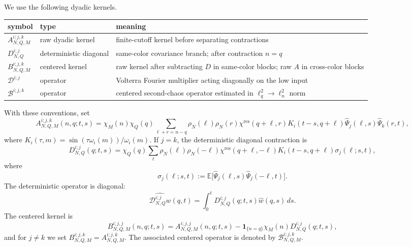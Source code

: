 \documentclass[10pt]{amsart}
\numberwithin{equation}{section}
\theoremstyle{plain}
\theoremstyle{definition}
\theoremstyle{remark}
\newcommand{\E}{\mathbb{E}}
\newcommand{\one}{\mathbf{1}}
\begin{document}
We use the following dyadic kernels.
\begin{center}
\small
\begin{tabular}{@{}p{}p{}p{}@{}}
\toprule
symbol & type & meaning \\
\midrule
$A_{N,Q,M}^{i;j,k}$ & raw dyadic kernel & finite-cutoff kernel before separating contractions \\
$D_{N,Q}^{i;j}$ & deterministic diagonal & same-color covariance branch; after contraction $n=q$ \\
$B_{N,Q,M}^{i;j,k}$ & centered kernel & raw kernel after subtracting $D$ in same-color blocks; raw $A$ in cross-color blocks \\
$\mathcal D^{i;j}$ & operator & Volterra Fourier multiplier acting diagonally on the low input \\
$\mathcal B^{i;j,k}$ & operator & centered second-chaos operator estimated in $\ell^2_q\to\ell^2_n$ norm \\
\bottomrule
\end{tabular}
\end{center}
With these conventions, set
\begin{equation}\label{eq:A-kernel}
A_{N,Q,M}^{i;j,k}(n,q;t,s)=\chi_M(n)\chi_Q(q)
\sum_{\ell+r=n-q}\rho_N(\ell)\rho_N(r)\chi^{\mathrm{res}}(q+\ell,r)
K_i(t-s,q+\ell)\widehat\Psi_j(\ell,s)\widehat\Psi_k(r,t),
\end{equation}
where $K_i(\tau,m)=\sin(\tau\omega_i(m))/\omega_i(m)$.  If $j=k$, the deterministic diagonal contraction is
\begin{equation}\label{eq:D-kernel}
D_{N,Q}^{i;j}(q;t,s)=\chi_Q(q)
\sum_{\ell}\rho_N(\ell)\rho_N(-\ell)\chi^{\mathrm{res}}(q+\ell,-\ell)
K_i(t-s,q+\ell)\sigma_j(\ell;s,t),
\end{equation}
where
\begin{equation}\label{eq:sigma-def}
\sigma_j(\ell;s,t):=\E\bigl[\widehat\Psi_j(\ell,s)\widehat\Psi_j(-\ell,t)\bigr].
\end{equation}
The deterministic operator is diagonal:
\begin{equation}\label{eq:D-operator-diagonal}
\widehat{\mathcal D_{N,Q}^{i;j}w}(q,t)=\int_0^tD_{N,Q}^{i;j}(q;t,s)\widehat w(q,s)\,ds.
\end{equation}
The centered kernel is
\begin{equation}\label{eq:B-kernel}
B_{N,Q,M}^{i;j,j}(n,q;t,s)=A_{N,Q,M}^{i;j,j}(n,q;t,s)-\one_{\{n=q\}}\chi_M(n)D_{N,Q}^{i;j}(q;t,s),
\end{equation}
and for $j\ne k$ we set $B_{N,Q,M}^{i;j,k}=A_{N,Q,M}^{i;j,k}$.  The associated centered operator is denoted by $\mathcal B_{N,Q,M}^{i;j,k}$.
\end{document}
